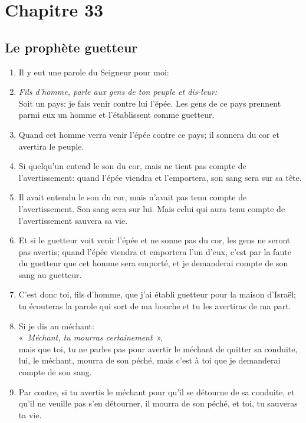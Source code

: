 \section*{Chapitre 33}
\subsection*{Le prophète guetteur}
\begin{enumerate}[leftmargin=\psleftmargin, labelsep = \pslabelsep, label={\arabic*}, font=\color{\pscolor}\small\textsuperscript, parsep=0em, itemsep=0em, topsep=0em ]
  \item Il y eut une parole du Seigneur pour moi:
  \item  {}\textit{Fils d’homme, parle aux gens de ton peuple et dis-leur:} \\
        Soit un pays: je fais venir contre lui l’épée.\brk
        Les gens de ce pays prennent parmi eux un homme \brk
        et l’établissent comme guetteur.
  \item {}Quand cet homme verra venir l’épée contre ce pays; \brk
        il sonnera du cor et avertira le peuple.
  \item {}Si quelqu’un entend le son du cor, mais ne tient pas compte de l’avertissement: \brk
        quand l’épée viendra et l’emportera, \brk
        son sang sera sur sa tête.
  \item {}Il avait entendu le son du cor, mais n’avait pas tenu compte de l’avertissement. \brk
        Son sang sera sur lui. \brk
        Mais celui qui aura tenu compte de l’avertissement sauvera sa vie.
  \item {}Et si le guetteur voit venir l’épée et ne sonne pas du cor, les gens ne seront pas avertis; \brk
        quand l’épée viendra et emportera l’un d’eux, \brk
        c’est par la faute du guetteur que cet homme sera emporté, \brk
        et je demanderai compte de son sang au guetteur. \parSpace

  \item {}C’est donc toi, fils d’homme, \brk
        que j’ai établi guetteur pour la maison d’Israël;\brk
        tu écouteras la parole qui sort de ma bouche \brk
        et tu les avertiras de ma part.
  \item {}Si je dis au méchant: \\
        «~\textit{Méchant, tu mourras certainement}~»,\\
        mais que toi, tu ne parles pas pour avertir le méchant de quitter sa conduite, \brk
        lui, le méchant, mourra de son péché, \brk
        mais c’est à toi que je demanderai compte de son sang.
  \item {}Par contre, si tu avertis le méchant pour qu’il se détourne de sa conduite, \brk
        et qu’il ne veuille pas s’en détourner, \brk
        il mourra de son péché, \brk
        et toi, tu sauveras ta vie. \parSpace


\end{enumerate}
